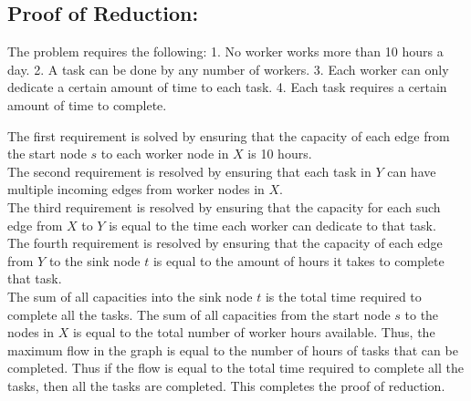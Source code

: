 \documentclass{article}
\theoremstyle{definition}
\theoremstyle{remark}
\theoremstyle{plain}
\begin{document}
\subsection*{Proof of Reduction:}
The problem requires the following:
1. No worker works more than 10 hours a day.
2. A task can be done by any number of workers.
3. Each worker can only dedicate a certain amount of time to each task.
4. Each task requires a certain amount of time to complete.

The first requirement is solved by ensuring that the capacity of each edge from the start node $s$ to each worker node in $X$ is 10 hours.\\
The second requirement is resolved by ensuring that each task in $Y$ can have multiple incoming edges from worker nodes in $X$. \\
The third requirement is resolved by ensuring that the capacity for each such edge from $X$ to $Y$ is equal to the time each worker can dedicate to that task.\\
The fourth requirement is resolved by ensuring that the capacity of each edge from $Y$ to the sink node $t$ is equal to the amount of hours it takes to complete that task.\\
The sum of all capacities into the sink node $t$ is the total time required to complete all the tasks. The sum of all capacities from the start node $s$ to the nodes in $X$ is equal to the total number of worker hours available. Thus, the maximum flow in the graph is equal to the number of hours of tasks that can be completed. Thus if the flow is equal to the total time required to complete all the tasks, then all the tasks are completed. This completes the proof of reduction.  
\end{document}
